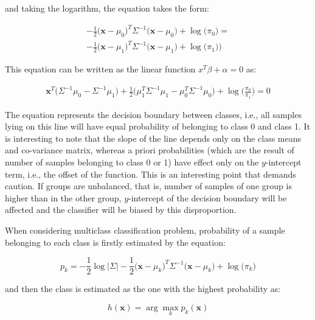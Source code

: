 \documentclass{article}
\newcommand{\argmax}{\arg\!\max} %
\begin{document}
and taking the logarithm, the equation takes the form: 

\begin{equation} 
\begin{split}
-\frac{1}{2}  \Big(\mathbf{x}-\mu_0\Big)^T  \Sigma^{-1} \Big(\mathbf{x}-\mu_0\Big) +  \log{\Big(\pi_0\Big)}= \\
-\frac{1}{2}  \Big(\mathbf{x}-\mu_1\Big)^T  \Sigma^{-1} \Big(\mathbf{x}-\mu_1\Big) +  \log{\Big(\pi_1)\Big)}
\end{split}
\end{equation}

This equation can be written as the linear function $x^T\beta + \alpha = 0$ as:

\begin{equation} 
\begin{split}
\mathbf{x}^T\Big(\Sigma^{-1} \mu_0 - \Sigma^{-1} \mu_1\Big) + \frac{1}{2} \Big(\mu_1^T \Sigma^{-1}\mu_1 - \mu_0^T \Sigma^{-1}\mu_0\Big)
+ \log\Big( \frac{\pi_0}{\pi_1}  \Big) = 0
\end{split}
\end{equation}

The equation represents the decision boundary between classes, i.e., all samples lying on this line will have equal probability of belonging to class 0 and class 1. It is interesting to note that the slope of the line depends only on the class means and co-variance matrix, whereas a priori probabilities (which are the result of number of samples belonging to class 0 or 1) have effect only on the $y$-intercept term, i.e., the offset of the function. This is an interesting point that demands caution. If groups are unbalanced, that is, number of samples of one group is higher than in the other group, $y$-intercept of the decision boundary will be affected and the classifier will be biased by this disproportion.

When considering multiclass classification problem, probability of a sample belonging to each class is firstly estimated by the equation:

\begin{equation}
p_k = -\frac{1}{2} \log \big\vert \Sigma \big\vert - \frac{1}{2}  \Big(\mathbf{x}-\mu_k\Big)^T  \Sigma^{-1} \Big(\mathbf{x}-\mu_k\Big) +  \log{\Big(\pi_k\Big)}
\end{equation}

and then the class is estimated as the one with the highest probability as:

\begin{equation} 
h(\mathbf{x}) = \argmax_k p_k(\mathbf{x})
\end{equation}
\end{document}
